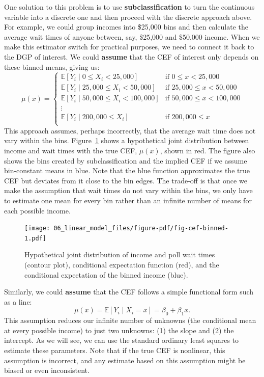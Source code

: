 \documentclass[
  letterpaper,
  DIV=11,
  numbers=noendperiod]{scrreprt}
\newcommand{\E}{\mathbb{E}}
\theoremstyle{plain}
\theoremstyle{definition}
\theoremstyle{definition}
\theoremstyle{remark}
\begin{document}
One solution to this problem is to use \textbf{subclassification} to
turn the continuous variable into a discrete one and then proceed with
the discrete approach above. For example, we could group incomes into
\$25,000 bins and then calculate the average wait times of anyone
between, say, \$25,000 and \$50,000 income. When we make this estimator
switch for practical purposes, we need to connect it back to the DGP of
interest. We could \textbf{assume} that the CEF of interest only depends
on these binned means, giving us:\\
\[
\mu(x) = 
\begin{cases}
  \E[Y_{i} \mid 0 \leq X_{i} < 25,000] &\text{if } 0 \leq x < 25,000 \\
  \E[Y_{i} \mid 25,000 \leq X_{i} < 50,000] &\text{if } 25,000 \leq x < 50,000\\
  \E[Y_{i} \mid 50,000 \leq X_{i} < 100,000] &\text{if } 50,000 \leq x < 100,000\\
  \vdots \\
  \E[Y_{i} \mid 200,000 \leq X_{i}] &\text{if } 200,000 \leq x\\
\end{cases}
\] This approach assumes, perhaps incorrectly, that the average wait
time does not vary within the bins. Figure~\ref{fig-cef-binned} shows a
hypothetical joint distribution between income and wait times with the
true CEF, \(\mu(x)\), shown in red. The figure also shows the bins
created by subclassification and the implied CEF if we assume
bin-constant means in blue. Note that the blue function approximates the
true CEF but deviates from it close to the bin edges. The trade-off is
that once we make the assumption that wait times do not vary within the
bins, we only have to estimate one mean for every bin rather than an
infinite number of means for each possible income.

\begin{figure}[th]

{\centering \texttt{[image: 06\_linear\_model\_files/figure-pdf/fig-cef-binned-1.pdf]}

}

\caption{\label{fig-cef-binned}Hypothetical joint distribution of income
and poll wait times (contour plot), conditional expectation function
(red), and the conditional expectation of the binned income (blue).}

\end{figure}

Similarly, we could \textbf{assume} that the CEF follows a simple
functional form such as a line: \[ 
\mu(x) = \E[Y_{i}\mid X_{i} = x] = \beta_{0} + \beta_{1} x.
\] This assumption reduces our infinite number of unknowns (the
conditional mean at every possible income) to just two unknowns: (1) the
slope and (2) the intercept. As we will see, we can use the standard
ordinary least squares to estimate these parameters. Note that if the
true CEF is nonlinear, this assumption is incorrect, and any estimate
based on this assumption might be biased or even inconsistent.
\end{document}
